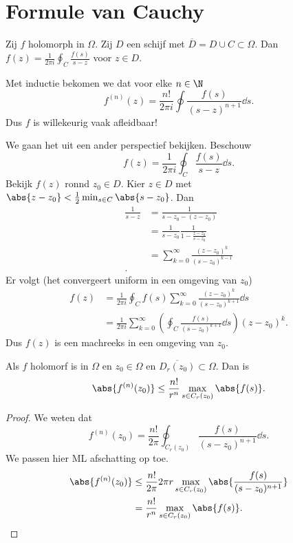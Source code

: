 \section{Formule van Cauchy} \label{sec:formule_van_cauchy}
\begin{stelling}
	Zij $f$ holomorph in $\Omega$. Zij $D$ een schijf met $\overline{D} = D \cup C \subset \Omega$. 
Dan $f(z)  = \frac{1}{2\pi i} \oint_{C} \frac{f(s)}{s - z}$ voor $z \in D$.
\end{stelling}
\begin{gevolg}
	 Met inductie bekomen we dat voor elke $n \in \N$ \[
		 f^{(n)}(z) = \frac{n!}{2\pi i} \oint \frac{f(s)}{(s - z)^{n + 1}} \dd s
	 .\] 
	 Dus $f$ is willekeurig vaak afleidbaar!
\end{gevolg}
We gaan het uit een ander perspectief bekijken.
Beschouw \[
	f(z) = \frac{1}{2 \pi i} \oint_C \frac{f(s)}{s - z} \dd s 
.\] 
Bekijk $f(z)$ ronnd $z_0 \in D$. Kier $z \in D$ met $\abs{z - z_0} < \frac{1}{ 2}\min_{s \in C}\abs{s - z_0}$.
Dan 
 \begin{align*}
	 \frac{1}{s-z} &=  \frac{1}{s - z_0 -(z- z_0)} \\
	 &= \frac{1}{s - z_0}\frac{1}{1 - \frac{z - z_0}{s - z_0}} \\
	 &= \sum_{k = 0}^{ \infty} \frac{(z - z_0)^{k}}{(s - z_0)^{k -1}} \\
.\end{align*}
Er volgt (het convergeert uniform in een omgeving van $z_0$)
\begin{align*}
	f(z)  &= \frac{1}{2 \pi i} \oint_C f(s) \sum_{k = 0}^{\infty}\frac{(z - z_0)^{k}}{(s - z_0)^{k + 1}} \dd s \\
	 &= \frac{1}{2 \pi i} \sum_{k = 0}^{\infty}\left( \oint_C \frac{f(s)}{(s - z_0)^{k+1}} \dd s \right) (z - z_0)^{k}
.\end{align*}
Dus $f(z) $ is een machreeks in een omgeving van  $z_0$.
\begin{gevolg}
	Als $f$ holomorf is in $\Omega$ en $z_0 \in \Omega$ en $\overline{D_r(z_0)}\subset \Omega$.
	Dan is \[
		\abs{f^{(n)}(z_0)}  \le \frac{n!}{r^{n}} \max_{s \in C_r(z_0)}\abs{f(s)}
	.\] 
\end{gevolg}
\begin{proof}
	We weten dat \[
		f^{(n)}(z_0) = \frac{n!}{2\pi} \oint_{C_r(z_0)}\frac{f(s)}{(s - z_0)^{n + 1}} \dd s
	.\] 
	We passen hier ML afschatting op toe. 
	 \begin{align*}
		 \abs{f^{(n)}(z_0)} &\le \frac{n!}{2\pi }2 \pi r \max_{s \in C_r(z_0)} \abs{\frac{f(s)}{(s - z_0)^{n + 1}}} \\&= \frac{n!}{r^{n}} \max _{s \in C_r(z_0)} \abs{f(s)} 
	.\end{align*}
\end{proof}
